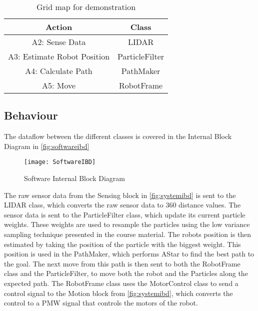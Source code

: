 \documentclass[Main]{subfiles}
\begin{document}
		\begin{table}[H]
			\centering
			\begin{tabular}{|c|c|}
			\hline
				Action & Class \\ 
			\hline
				A2: Sense Data & LIDAR  \\ 
			\hline
				A3: Estimate Robot Position & ParticleFilter  \\ 
			\hline
				A4: Calculate Path & PathMaker  \\ 
			\hline
				A5: Move & RobotFrame  \\ 
			\hline
			\end{tabular}
			\caption{Grid map for demonstration}
			\label{table:action_class_map} 
		\end{table} \noindent
		
	\subsection{Behaviour} %
	\label{sub:software_behaviour}
	
		The dataflow between the different classes is covered in the Internal Block Diagram in \autoref{fig:softwareibd}
		
		\begin{figure}[H]
			\centering
			\texttt{[image: SoftwareIBD]}
			\caption{Software Internal Block Diagram}
			\label{fig:softwareibd}
		\end{figure}

		The raw sensor data from the Sensing block in \autoref{fig:systemibd} is sent to the LIDAR class, which  converts the raw sensor data to 360 distance values.
		The sensor data is sent to the ParticleFilter class, which update its current particle weights. 
		These weights are used to resample the particles using the low variance sampling technique presented in the course material.
		The robots position is then estimated by taking the position of the particle with the biggest weight.
		This position is used in the PathMaker, which performs AStar to find the best path to the goal. The next move from this path is then sent to both the RobotFrame class and the ParticleFilter, to move both the robot and the Particles along the expected path.
		The RobotFrame class uses the MotorControl class to send a control signal to the Motion block from \autoref{fig:systemibd}, which converts the control to a PMW signal that controls the motors of the robot.
	
\end{document}
